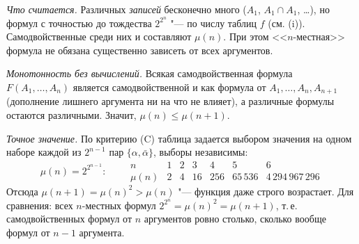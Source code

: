 \begin{solution}[5 (\S\,3)]
\emph{Что считается.} Различных \emph{записей} бесконечно много
($A_1$, $A_1\cap A_1$, \dots), но формул с точностью до тождества
$2^{2^n}$ "--- по числу таблиц $f$ (см. (i)). Самодвойственные среди них
и составляют $\mu(n)$. При этом <<$n$-местная>> формула не обязана
существенно зависеть от всех аргументов.

\emph{Монотонность без вычислений.} Всякая самодвойственная формула
$F(A_1,\dots,A_n)$ является самодвойственной и как формула от
$A_1,\dots,A_n,A_{n+1}$ (дополнение лишнего аргумента ни на что не
влияет), а различные формулы остаются различными. Значит,
$\mu(n)\le\mu(n+1)$.

\emph{Точное значение.} По критерию (C) таблица задается выбором значения
на одном наборе каждой из $2^{n-1}$ пар $\{\alpha,\bar\alpha\}$, выборы
независимы:
\[
\mu(n)=2^{2^{n-1}}:\qquad
\begin{array}{c|cccccc}
n&1&2&3&4&5&6\\\hline
\mu(n)&2&4&16&256&65\,536&4\,294\,967\,296
\end{array}
\]
Отсюда $\mu(n+1)=\mu(n)^2>\mu(n)$ "--- функция даже строго возрастает.
Для сравнения: всех $n$-местных формул $2^{2^n}=\mu(n)^2=\mu(n+1)$,
т.\,е. самодвойственных формул от $n$ аргументов ровно столько, сколько
вообще формул от $n-1$ аргумента.
\end{solution}


